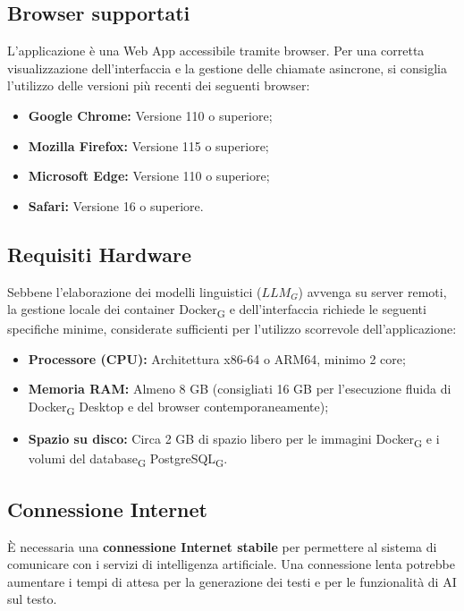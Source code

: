 \documentclass[11pt,a4paper]{article}
\newcommand{\gls}[1]{#1\textsubscript{G}}
\begin{document}
\subsection{Browser supportati}
L'applicazione è una Web App accessibile tramite browser. Per una corretta visualizzazione dell'interfaccia e la gestione delle chiamate asincrone, si consiglia l'utilizzo delle versioni più recenti dei seguenti browser:
\begin{itemize}
    \item \textbf{Google Chrome:} Versione 110 o superiore;
    \item \textbf{Mozilla Firefox:} Versione 115 o superiore;
    \item \textbf{Microsoft Edge:} Versione 110 o superiore;
    \item \textbf{Safari:} Versione 16 o superiore.
\end{itemize}

\subsection{Requisiti Hardware}
Sebbene l'elaborazione dei modelli linguistici ($LLM_G$) avvenga su server remoti, la gestione locale dei container \gls{Docker} e dell'interfaccia richiede le seguenti specifiche minime, considerate sufficienti per l'utilizzo scorrevole dell'applicazione:
\begin{itemize}
    \item \textbf{Processore (CPU):} Architettura x86-64 o ARM64, minimo 2 core;
    \item \textbf{Memoria RAM:} Almeno 8 GB (consigliati 16 GB per l'esecuzione fluida di \gls{Docker} Desktop e del browser contemporaneamente);
    \item \textbf{Spazio su disco:} Circa 2 GB di spazio libero per le immagini \gls{Docker} e i volumi del \gls{database} \gls{PostgreSQL}.
\end{itemize}

\subsection{Connessione Internet}
È necessaria una \textbf{connessione Internet stabile} per permettere al sistema di comunicare con i servizi di intelligenza artificiale. Una connessione lenta potrebbe aumentare i tempi di attesa per la generazione dei testi e per le funzionalità di AI sul testo.

\newpage

\end{document}
